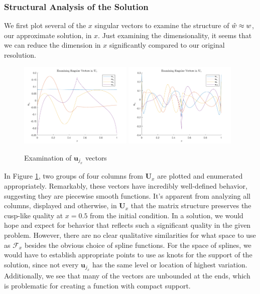 \documentclass[12pt]{article}
\begin{document}
    \subsubsection{Structural Analysis of the Solution}\label{sec:structure}

    We first plot several of the $x$ singular vectors to examine the structure of $\Hat{w}\approx w$, our approximate solution, in $x$. Just examining the dimensionality, it seems that we can reduce the dimension in $x$ significantly compared to our original resolution.
    \begin{figure}[t]
        \centering
        \includegraphics[width=0.48\textwidth]{figures/burgers_ux_1_4.pdf}
        \includegraphics[width=0.48\textwidth]{figures/burgers_ux_7_10.pdf}
        \caption{Examination of $\mathbf{u}_{j_x}$ vectors}
        \label{fig:burgers_ux}
    \end{figure}
    In Figure \ref{fig:burgers_ux}, two groups of four columns from $\mathbf{U}_x$ are plotted and enumerated appropriately. Remarkably, these vectors have incredibly well-defined behavior, suggesting they are piecewise smooth functions. It's apparent from analyzing all columns, displayed and otherwise, in $\mathbf{U}_x$ that the matrix structure preserves the cusp-like quality at $x=0.5$ from the initial condition. In a solution, we would hope and expect for behavior that reflects such a significant quality in the given problem. However, there are no clear qualitative similarities for what space to use as $\mathcal{F}_x$ besides the obvious choice of spline functions. For the space of splines, we would have to establish appropriate points to use as knots for the support of the solution, since not every $\mathbf{u}_{j_x}$ has the same level or location of highest variation. Additionally, we see that many of the vectors are unbounded at the ends, which is problematic for creating a function with compact support.
\end{document}
